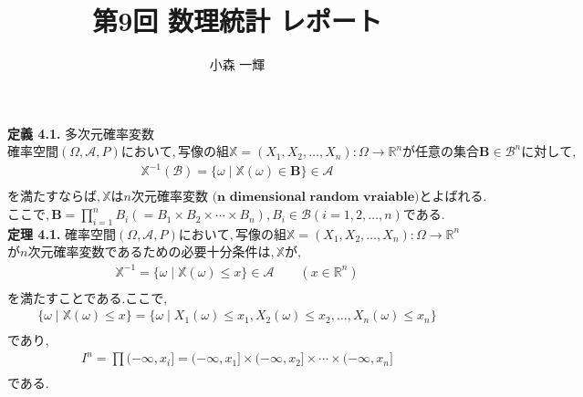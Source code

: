 \documentclass[dvipdfmx,10pt, a4j]{jarticle}
\title{第9回 数理統計 レポート}
\author{小森 一輝}
\theoremstyle{definition}
\begin{document}
\maketitle

\setcounter{section}{2}

\noindent
\textbf{定義 4.1.} 多次元確率変数\\
$確率空間(\Omega, \mathscr{A}, P)において, 写像の組 \mathbb{X} = (X_1, X_2, \dots, X_n):\Omega \to \mathbb{R}^{n}が任意の集合\mathbf{B} \in \mathscr{B}^{n}に対して,$\\
\begin{align*}
    \mathbb{X}^{-1}(\mathscr{B}) = \{\omega \mid \mathbb{X}(\omega) \in \mathbf{B}\} \in \mathscr{A} \\
\end{align*}
$を満たすならば, \mathbb{X} はn \textbf{次元確率変数 (n dimensional random vraiable)} とよばれる.$\\
$ここで, \mathbf{B} = \prod_{i=1}^{n}B_i (=B_1 \times B_2 \times \cdots \times B_n), B_i \in \mathscr{B} (i = 1,2, \dots ,n)である.$\\

\noindent
\textbf{定理 4.1.} $確率空間 (\Omega, \mathscr{A}, P) において, 写像の組 \mathbb{X} = (X_1, X_2, \dots, X_n):\Omega \to \mathbb{R}^{n}$
$がn次元確率変数であるための必要十分条件は, \mathbb{X} が,$
\begin{align*}
    \mathbb{X}^{-1} = \{\omega \mid \mathbb{X}(\omega) \leq x\} \in \mathscr{A} \qquad (x \in \mathbb{R}^{n}) \\
\end{align*}
を満たすことである.ここで,\\
\begin{align*}
    \{\omega \mid \mathbb{X}(\omega) \leq x\} = \{\omega \mid X_1(\omega) \leq x_1, X_2(\omega) \leq x_2, \dots , X_n(\omega) \leq x_n\} \\
\end{align*}
であり,\\
\begin{align*}
    I^{n} = \prod (- \infty, x_i] = (- \infty, x_1] \times (- \infty, x_2] \times \cdots \times (- \infty, x_n] \\
\end{align*}
である.\\
\end{document}
